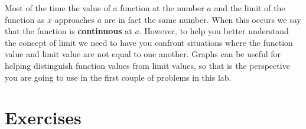 \documentclass[12pt,]{book}
\newcommand{\terminology}[1]{\textbf{#1}}
\theoremstyle{plain}
\theoremstyle{definition}
\numberwithin{equation}{section}
\begin{document}
\par
Most of the time the value of a function at the number \(a\) and the limit of the function as \(x\) approaches \(a\) are in fact the same number. When this occurs we say that the function is \terminology{continuous} at \(a\). However, to help you better understand the concept of limit we need to have you confront situations where the function value and limit value are not equal to one another. Graphs can be useful for helping distinguish function values from limit values, so that is the perspective you are going to use in the first couple of problems in this lab.%
\typeout{************************************************}
\typeout{************************************************}
\section*{Exercises}\label{exercises-4}
\end{document}
